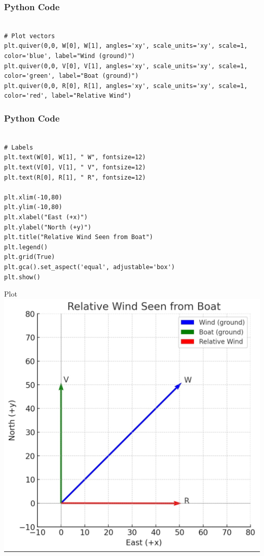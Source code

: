 \documentclass{beamer}
\begin{document}
\begin{frame}[fragile]
    \frametitle{Python Code}
    \begin{lstlisting}

# Plot vectors
plt.quiver(0,0, W[0], W[1], angles='xy', scale_units='xy', scale=1, color='blue', label="Wind (ground)")
plt.quiver(0,0, V[0], V[1], angles='xy', scale_units='xy', scale=1, color='green', label="Boat (ground)")
plt.quiver(0,0, R[0], R[1], angles='xy', scale_units='xy', scale=1, color='red', label="Relative Wind")

    \end{lstlisting}
\end{frame}
\begin{frame}[fragile]
    \frametitle{Python Code}
    \begin{lstlisting}

# Labels
plt.text(W[0], W[1], " W", fontsize=12)
plt.text(V[0], V[1], " V", fontsize=12)
plt.text(R[0], R[1], " R", fontsize=12)

plt.xlim(-10,80)
plt.ylim(-10,80)
plt.xlabel("East (+x)")
plt.ylabel("North (+y)")
plt.title("Relative Wind Seen from Boat")
plt.legend()
plt.grid(True)
plt.gca().set_aspect('equal', adjustable='box')
plt.show()

    \end{lstlisting}
\end{frame}


\begin{frame}{Plot}
    \centering
    \includegraphics[width=\columnwidth, height=0.8\textheight, keepaspectratio]{figs/python image.png}     
\end{frame}
\end{document}

